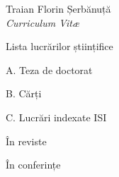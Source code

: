 \documentclass[10pt, romanian]{article}
\begin{document}
\begin{cv}{Traian Florin Șerbănuță\\{\large \itshape Curriculum Vit\ae}}



\renewcommand*{\cvbibname}{}

  \begin{cvlist}{Lista lucrărilor științifice}
  \item[A. Teza de doctorat]
  \item[B. Cărți]
  
  \item[C. Lucrări indexate ISI]

  \item[\hfill În reviste]
    
  \item[\hfill În conferințe]
    
  \end{cvlist}

\end{cv}
\end{document}
